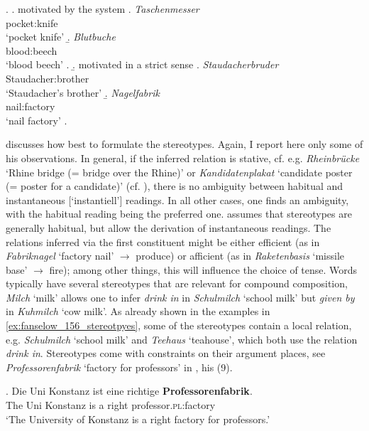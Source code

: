 \ex. 
\a. motivated by the system
\a. 
\gll
\emph{Taschenmesser}\\
pocket:knife\\
`pocket knife'
\b. \gll
\emph{Blutbuche}\\
blood:beech\\
`blood beech'
\z. 
\b. motivated in a strict sense
\a. \emph{Staudacherbruder}\\
Staudacher:brother\\
`Staudacher's brother'
\b. \emph{Nagelfabrik}\\
nail:factory\\
`nail factory'
\z.
  
\citet[\S 18]{Fanselow:1981} discusses how best to formulate the
stereotypes. Again, I report here only some of his observations. In general,
if the inferred relation is  stative, cf. e.g. \emph{Rheinbrücke}
`Rhine bridge (= bridge over the Rhine)' or
\emph{Kandidatenplakat}  `candidate poster (= poster for a candidate)' (cf. \citealt[157]{Fanselow:1981}), there is no
ambiguity between habitual and instantaneous [`instantiell'] readings.
 In all other cases, one
finds an ambiguity, with the habitual reading being the preferred
one. \citet[192]{Fanselow:1981} assumes that stereotypes are generally
habitual, but allow the derivation of instantaneous readings. The relations
inferred via the first constituent might be either efficient (as in
\emph{Fabriknagel} `factory nail' $\rightarrow$ produce) or afficient (as in
\emph{Raketenbasis} `missile base' $\rightarrow$ fire); among other things,
this will influence the choice of tense. Words typically have several
stereotypes that are relevant for compound composition, \emph{Milch}
`milk' allows one to
infer \emph{drink in} in \emph{Schulmilch} `school milk' but \emph{given by}
in \emph{Kuhmilch} `cow milk'. As already shown in the
examples in \ref{ex:fanselow_156_stereotpyes}, some of the stereotypes contain
a local relation, e.g. \emph{Schulmilch} `school milk' and \emph{Teehaus} `teahouse', which both use
the relation \emph{drink in}. \enlargethispage{\baselineskip}
Stereotypes come with constraints on their
argument places, see \emph{Professorenfabrik} `factory for professors' in \Next, his
(9).

\ex. \gll Die Uni Konstanz ist eine richtige \textbf{Professorenfabrik}.\\
The Uni Konstanz is a right professor.\textsc{pl}:factory\\
`The University of Konstanz is a right factory for professors.' 

